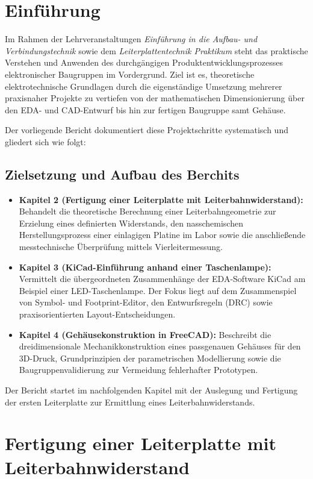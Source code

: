 \chapter{Einführung}
Im Rahmen der Lehrveranstaltungen \textit{Einführung in die Aufbau- und Verbindungstechnik} sowie dem \textit{Leiterplattentechnik Praktikum} steht das praktische Verstehen und Anwenden des durchgängigen Produktentwicklungsprozesses elektronischer Baugruppen im Vordergrund. Ziel ist es, theoretische elektrotechnische Grundlagen durch die eigenständige Umsetzung mehrerer praxisnaher Projekte zu vertiefen von der mathematischen Dimensionierung über den EDA- und CAD-Entwurf bis hin zur fertigen Baugruppe samt Gehäuse.

Der vorliegende Bericht dokumentiert diese Projektschritte systematisch und gliedert sich wie folgt:

\section{Zielsetzung und Aufbau des Berchits}
\begin{itemize}
    \item \textbf{Kapitel 2 (Fertigung einer Leiterplatte mit Leiterbahnwiderstand):} Behandelt die theoretische Berechnung einer Leiterbahngeometrie zur Erzielung eines definierten Widerstands, den nasschemischen Herstellungsprozess einer einlagigen Platine im Labor sowie die anschließende messtechnische Überprüfung mittels Vierleitermessung.
    \item \textbf{Kapitel 3 (KiCad-Einführung anhand einer Taschenlampe):} Vermittelt die übergeordneten Zusammenhänge der EDA-Software KiCad am Beispiel einer LED-Taschenlampe. Der Fokus liegt auf dem Zusammenspiel von Symbol- und Footprint-Editor, den Entwurfsregeln (DRC) sowie praxisorientierten Layout-Entscheidungen.
    \item \textbf{Kapitel 4 (Gehäusekonstruktion in FreeCAD):} Beschreibt die dreidimensionale Mechanikkonstruktion eines passgenauen Gehäuses für den 3D-Druck, Grundprinzipien der parametrischen Modellierung sowie die Baugruppenvalidierung zur Vermeidung fehlerhafter Prototypen.
\end{itemize}

Der Bericht startet im nachfolgenden Kapitel mit der Auslegung und Fertigung der ersten Leiterplatte zur Ermittlung eines Leiterbahnwiderstands.
\chapter{Fertigung einer Leiterplatte mit Leiterbahnwiderstand}

